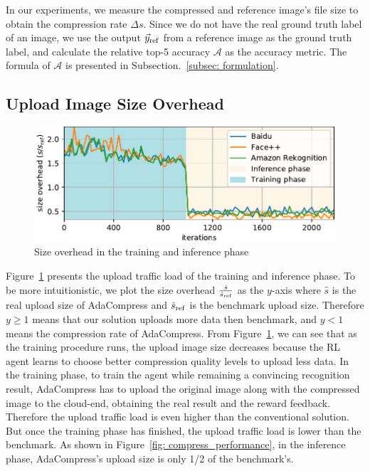 In our experiments, we measure the compressed and reference image's file size to obtain the compression rate $ \Delta s $. Since we do not have the real ground truth label of an image, we use the output $ \vec{y}_{\rm ref} $ from a reference image as the ground truth label, and calculate the relative top-5 accuracy $ \mathcal{A} $ as the accuracy metric. The formula of $ \mathcal{A} $ is presented in Subsection.~\ref{subsec: formulation}.

\subsection{Upload Image Size Overhead}

\begin{figure}[!t]
	\includegraphics[width=0.8\linewidth]{figures/train_steps_new.pdf}
	\caption{Size overhead in the training and inference phase}
	\label{fig: train_steps}
\end{figure}

Figure~\ref{fig: train_steps} presents the upload traffic load of the training and inference phase. To be more intuitionistic, we plot the size overhead {\color{revise2} $ \frac{\hat{s}}{\hat{s}_{\rm ref}} $} as the $ y $-axis where {\color{revise2} $ \hat{s} $} is the real upload size of AdaCompress and {\color{revise2} $ \hat{s}_{\rm ref} $} is the benchmark upload size. Therefore $ y \geq 1 $ means that our solution uploads more data then benchmark, and $ y < 1 $ means the compression rate of AdaCompress. From Figure~\ref{fig: train_steps}, we can see that as the training procedure runs, the upload image size decreases because the RL agent learns to choose better compression quality levels to upload less data. In the training phase, to train the agent while remaining a convincing recognition result, AdaCompress has to upload the original image along with the compressed image to the cloud-end, obtaining the real result and the reward feedback. Therefore the upload traffic load is even higher than the conventional solution. But once the training phase has finished, the upload traffic load is lower than the benchmark. As shown in Figure~\ref{fig: compress_performance}, in the inference phase, AdaCompress's upload size is only 1/2 of the benchmark's. %


